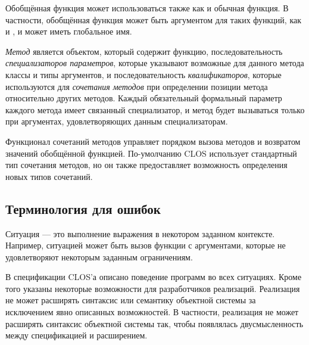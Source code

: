 Обобщённая функция может использоваться также как и обычная функция. В
частности, обобщённая функция может быть аргументом для таких функций, как
 и , и может иметь глобальное имя.%

\emph{Метод} является объектом, который содержит функцию, последовательность
\emph{специализаторов параметров}, которые указывают возможные для данного
метода классы и типы аргументов, и последовательность \emph{квалификаторов},
которые используются для \emph{сочетания методов} при определении позиции метода
относительно других методов.  Каждый обязательный формальный параметр каждого
метода имеет связанный специализатор, и метод будет вызываться только при
аргументах, удовлетворяющих данным специализаторам.

Функционал сочетаний методов управляет порядком вызова методов и возвратом
значений обобщённой функцией. По-умолчанию CLOS использует
стандартный тип сочетания методов, но он также предоставляет возможность
определения новых типов сочетаний.

\subsection{Терминология для ошибок}
\label{Error-Terminology-SECTION}

Ситуация --- это выполнение выражения в некотором заданном контексте. Например,
ситуацией может быть вызов функции с аргументами, которые не удовлетворяют
некоторым заданным ограничениям.

В спецификации CLOS'а описано поведение программ во всех ситуациях. Кроме того
указаны некоторые возможности для разработчиков реализаций. Реализация не может
расширять синтаксис или семантику объектной системы за исключением явно
описанных возможностей.  В частности, реализация не может расширять синтаксис
объектной системы так, чтобы появлялась двусмысленность между спецификацией и
расширением.

